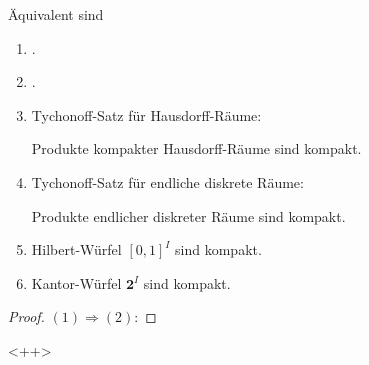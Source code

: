 \begin{thm}
  Äquivalent sind
\begin{enumerate}[(1)]
    \item \PIT.
    \item \UFT.
    \item Tychonoff-Satz für Hausdorff-Räume: 
      \begin{addmargin}[2em]{2em}%
        Produkte kompakter Hausdorff-Räume sind kompakt.
      \end{addmargin}
    \item Tychonoff-Satz für endliche diskrete Räume: 
      \begin{addmargin}[2em]{2em}%
        Produkte endlicher diskreter Räume sind kompakt.
      \end{addmargin}
    \item Hilbert-Würfel $[0,1]^I$ sind kompakt.
    \item Kantor-Würfel $\mathbf{2}^I$ sind kompakt.
  \end{enumerate}

  \begin{proof}
    $(1)\Rightarrow(2)$:
  \end{proof}<++>

\end{thm}

